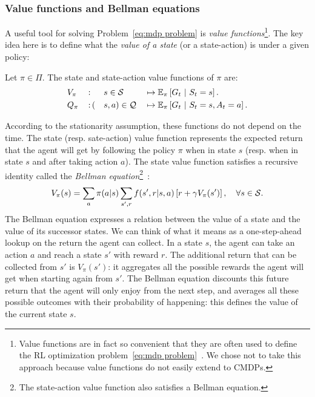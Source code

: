 		\subsubsection{Value functions and Bellman equations} 
			A useful tool for solving Problem~\eqref{eq:mdp problem} is\emph{ value functions}\footnote{Value functions are in fact so convenient that they are often used to define the RL optimization problem~\eqref{eq:mdp problem}~\cite{sutton2018reinforcement}. We chose not to take this approach because value functions do not easily extend to CMDPs.}. The key idea here is to define what the\emph{ value of a state} (or a state-action) is under a given policy:
			\begin{definition}
				Let $\pi\in\Pi$. The state and state-action value functions of $\pi$ are:
				\begin{alignat}{7}
				& V_\pi\,&:&\, &s&\in\S & & \mapsto \expected_\pi\left[G_t~\middle|~S_t = s\right]. \label{eq:state value} \\
				& Q_\pi\,&:&\, (&s&, a)\in\Q & & \mapsto \expected_\pi\left[G_t~\middle|~S_t = s, A_t = a\right]. \label{eq:stateaction value}
				\end{alignat}
			\end{definition}
			According to the stationarity assumption, these functions do not depend on the time. The state (resp. sate-action) value function represents the expected return that the agent will get by following the policy $\pi$ when in state $s$ (resp. when in state $s$ and after taking action $a$). The state value function satisfies a recursive identity called the\emph{ Bellman equation}\footnote{The state-action value function also satisfies a Bellman equation.}~\cite[Section\,3.5]{sutton2018reinforcement}:
			\begin{equation}
				V_\pi(s) = \sum_{a} \pi(a|s) \sum_{s', r}f(s', r |s, a)\left[r + \gamma V_\pi(s')\right],\quad \forall s\in\S. \label{eq:bellman}
			\end{equation}
			The Bellman equation expresses a relation between the value of a state and the value of its successor states. We can think of what it means as a one-step-ahead lookup on the return the agent can collect. In a state $s$, the agent can take an action $a$ and reach a state $s'$ with reward $r$. The additional return that can be collected from $s'$ is $V_\pi(s')$: it aggregates all the possible rewards the agent will get when starting again from $s'$. The Bellman equation discounts this future return that the agent will only enjoy from the next step, and averages all these possible outcomes with their probability of happening: this defines the value of the current state $s$.
